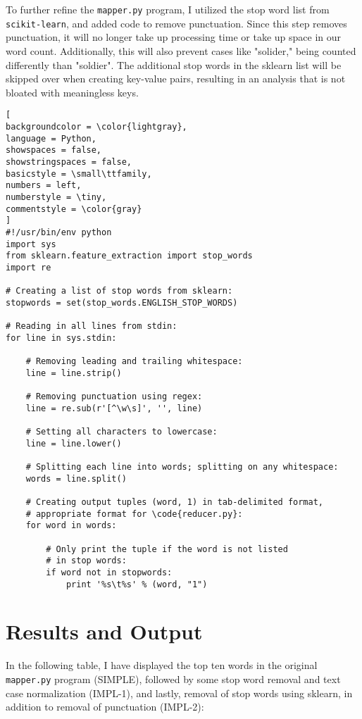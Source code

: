 \documentclass[]{article}
\newcommand{\code}[1]{\colorbox{light-gray}{\texttt{#1}}}
\begin{document}
To further refine the \code{mapper.py} program, I utilized the stop word list from \code{scikit-learn}, and added code to remove punctuation.  Since this step removes punctuation, it will no longer take up processing time or take up space in our word count.  Additionally, this will also prevent cases like "solider," being counted differently than "soldier".  The additional stop words in the sklearn list will be skipped over when creating key-value pairs, resulting in an analysis that is not bloated with meaningless keys.

\begin{lstlisting}[
backgroundcolor = \color{lightgray},
language = Python,
showspaces = false,
showstringspaces = false,
basicstyle = \small\ttfamily,
numbers = left,
numberstyle = \tiny,
commentstyle = \color{gray}
]
#!/usr/bin/env python
import sys
from sklearn.feature_extraction import stop_words
import re

# Creating a list of stop words from sklearn:
stopwords = set(stop_words.ENGLISH_STOP_WORDS)

# Reading in all lines from stdin:
for line in sys.stdin:

	# Removing leading and trailing whitespace:
	line = line.strip()

	# Removing punctuation using regex:
	line = re.sub(r'[^\w\s]', '', line)

	# Setting all characters to lowercase:
	line = line.lower()

	# Splitting each line into words; splitting on any whitespace:
	words = line.split()

	# Creating output tuples (word, 1) in tab-delimited format, 
	# appropriate format for \code{reducer.py}:
	for word in words:
	
		# Only print the tuple if the word is not listed
		# in stop words:
		if word not in stopwords:
			print '%s\t%s' % (word, "1")
\end{lstlisting}


\section{Results and Output}
In the following table, I have displayed the top ten words in the original \code{mapper.py} program (SIMPLE), followed by some stop word removal and text case normalization (IMPL-1), and lastly, removal of stop words using sklearn, in addition to removal of punctuation (IMPL-2):
\end{document}

